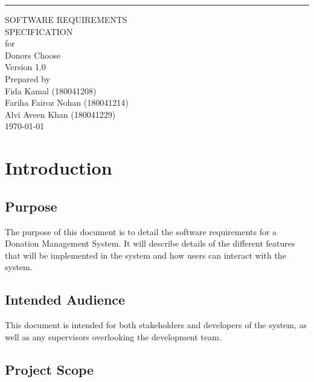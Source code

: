 \documentclass{scrreprt}
\date{}
\begin{document}
\begin{flushright}
    \rule{16cm}{5pt}\vskip1cm
    \begin{bfseries}
        \Huge{SOFTWARE REQUIREMENTS\\ SPECIFICATION}\\
        \vspace{1.9cm}
        for\\
        \vspace{1.9cm}
        Donors Choose\\
        \vspace{1.9cm}
        \LARGE{Version 1.0}\\
        \vspace{1.9cm}
        Prepared by\\
        Fida Kamal (180041208)\\
        Fariha Fairoz Nohan (180041214)\\
        Alvi Aveen Khan (180041229)\\
        \vspace{1.9cm}
        \today\\
    \end{bfseries}
\end{flushright}

\tableofcontents

\chapter{Introduction}

\section{Purpose}
The purpose of this document is to detail the software requirements for a Donation Management System. It will describe details of the different features that will be implemented in the system and how users can interact with the system.\\

\section{Intended Audience}

This document is intended for both stakeholders and developers of the system, as well as any supervisors overlooking the development team.\\

\section{Project Scope}
\end{document}
